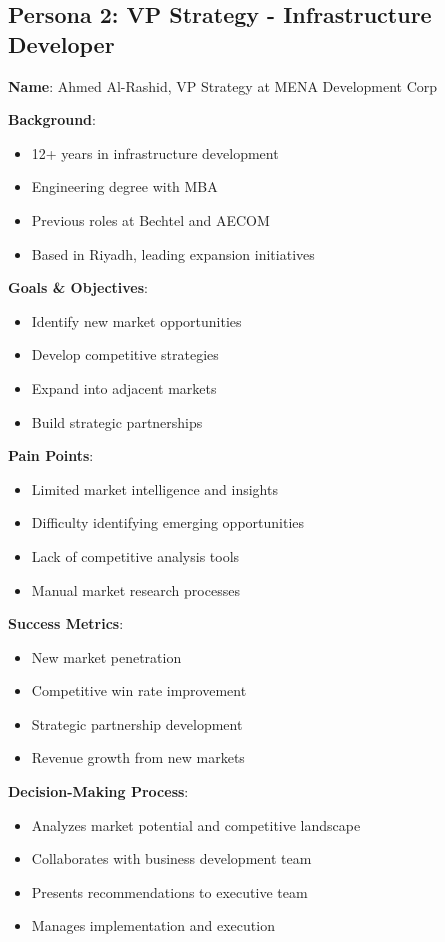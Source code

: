 \documentclass[business]{../templates/infraradar-main}
\begin{document}
\subsection{Persona 2: VP Strategy - Infrastructure Developer}
\textbf{Name}: Ahmed Al-Rashid, VP Strategy at MENA Development Corp

\textbf{Background}:
\begin{itemize}
    \item 12+ years in infrastructure development
    \item Engineering degree with MBA
    \item Previous roles at Bechtel and AECOM
    \item Based in Riyadh, leading expansion initiatives
\end{itemize}

\textbf{Goals \& Objectives}:
\begin{itemize}
    \item Identify new market opportunities
    \item Develop competitive strategies
    \item Expand into adjacent markets
    \item Build strategic partnerships
\end{itemize}

\textbf{Pain Points}:
\begin{itemize}
    \item Limited market intelligence and insights
    \item Difficulty identifying emerging opportunities
    \item Lack of competitive analysis tools
    \item Manual market research processes
\end{itemize}

\textbf{Success Metrics}:
\begin{itemize}
    \item New market penetration
    \item Competitive win rate improvement
    \item Strategic partnership development
    \item Revenue growth from new markets
\end{itemize}

\textbf{Decision-Making Process}:
\begin{itemize}
    \item Analyzes market potential and competitive landscape
    \item Collaborates with business development team
    \item Presents recommendations to executive team
    \item Manages implementation and execution
\end{itemize}
\end{document}
